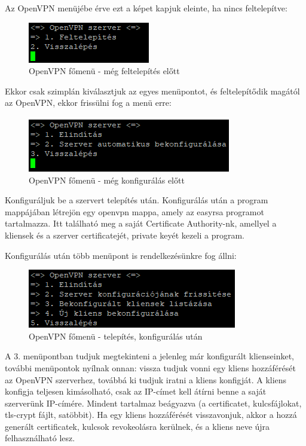 \pagebreak


Az OpenVPN menüjébe érve ezt a képet kapjuk eleinte, ha nincs feltelepítve:

\begin{figure}[h]
\centering
\includegraphics[scale=1]{images/openvpn_install.png}
\caption{OpenVPN főmenü - még feltelepítés előtt}
\end{figure}

Ekkor csak szimplán kiválasztjuk az egyes menüpontot, és feltelepítődik magától az OpenVPN, ekkor frissülni fog a menü erre:

\begin{figure}[h]
\centering
\includegraphics[scale=1]{images/openvpn_preconfig.png}
\caption{OpenVPN főmenü - még konfigurálás előtt}
\end{figure}

Konfiguráljuk be a szervert telepítés után. Konfigurálás után a program mappájában létrejön egy openvpn mappa, amely az easyrsa programot tartalmazza. Itt található meg a saját Certificate Authority-nk, amellyel a kliensek és a szerver certificatejét, private keyét kezeli a program.

Konfigurálás után több menüpont is rendelkezésünkre fog állni:

\begin{figure}[h]
\centering
\includegraphics[scale=1]{images/openvpn_after_install.png}
\caption{OpenVPN főmenü - telepítés, konfigurálás után}
\end{figure}

A 3. menüpontban tudjuk megtekinteni a jelenleg már konfigurált klienseinket, további menüpontok nyílnak onnan: vissza tudjuk vonni egy kliens hozzáférését az OpenVPN szerverhez, továbbá ki tudjuk iratni a kliens konfigját. A kliens konfigja teljesen kimásolható, csak az IP-címet kell átírni benne a saját szerverünk IP-címére. Mindent tartalmaz beágyazva (a certificatet, kulcsfájlokat, tls-crypt fájlt, satöbbit).
Ha egy kliens hozzáférését visszavonjuk, akkor a hozzá generált certificatek, kulcsok revokeolásra kerülnek, és a kliens neve újra felhasználható lesz.


